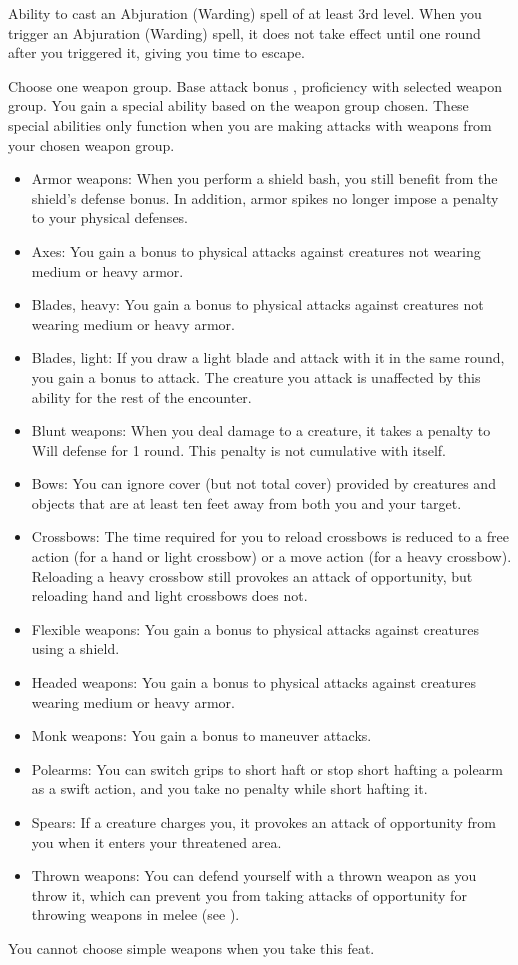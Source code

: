 \featpre Ability to cast an Abjuration (Warding) spell of at least 3rd level.
\featben When you trigger an Abjuration (Warding) spell, it does not take effect until one round after you triggered it, giving you time to escape.

Choose one weapon group.
 Base attack bonus , proficiency with selected weapon group.
 You gain a special ability based on the weapon group chosen. These special abilities only function when you are making attacks with weapons from your chosen weapon group.
\begin{itemize}
    \item Armor weapons: When you perform a shield bash, you still benefit from the shield's defense bonus. In addition, armor spikes no longer impose a penalty to your physical defenses.
    \item Axes: You gain a  bonus to physical attacks against creatures not wearing medium or heavy armor.
    \item Blades, heavy: You gain a  bonus to physical attacks against creatures not wearing medium or heavy armor.
    \item Blades, light: If you draw a light blade and attack with it in the same round, you gain a  bonus to attack. The creature you attack is unaffected by this ability for the rest of the encounter.
    \item Blunt weapons: When you deal damage to a creature, it takes a  penalty to Will defense for 1 round. This penalty is not cumulative with itself.
    \item Bows: You can ignore cover (but not total cover) provided by creatures and objects that are at least ten feet away from both you and your target.
    \item Crossbows: The time required for you to reload crossbows is reduced to a free action (for a hand or light crossbow) or a move action (for a heavy crossbow). Reloading a heavy crossbow still provokes an attack of opportunity, but reloading hand and light crossbows does not.
    \item Flexible weapons: You gain a  bonus to physical attacks against creatures using a shield.
    \item Headed weapons: You gain a  bonus to physical attacks against creatures wearing medium or heavy armor.
    \item Monk weapons: You gain a  bonus to maneuver attacks.
    \item Polearms: You can switch grips to short haft or stop short hafting a polearm as a swift action, and you take no penalty while short hafting it.
    \item Spears: If a creature charges you, it provokes an attack of opportunity from you when it enters your threatened area.
    \item Thrown weapons: You can defend yourself with a thrown weapon as you throw it, which can prevent you from taking attacks of opportunity for throwing weapons in melee (see ).
\end{itemize}
 You cannot choose simple weapons when you take this feat.

